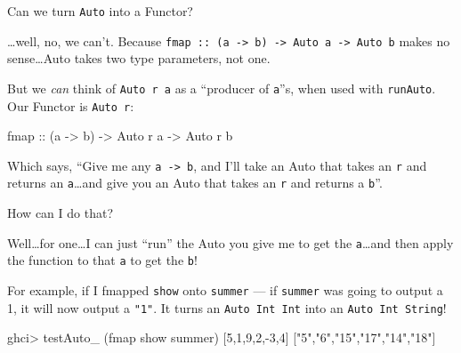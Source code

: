 \documentclass[]{article}
\newenvironment{Shaded}{}{}
\newcommand{\CommentTok}[1]{\textcolor[rgb]{0.38,0.63,0.69}{\textit{#1}}}
\newcommand{\DataTypeTok}[1]{\textcolor[rgb]{0.56,0.13,0.00}{#1}}
\newcommand{\DecValTok}[1]{\textcolor[rgb]{0.25,0.63,0.44}{#1}}
\newcommand{\FunctionTok}[1]{\textcolor[rgb]{0.02,0.16,0.49}{#1}}
\newcommand{\KeywordTok}[1]{\textcolor[rgb]{0.00,0.44,0.13}{\textbf{#1}}}
\newcommand{\NormalTok}[1]{#1}
\newcommand{\OtherTok}[1]{\textcolor[rgb]{0.00,0.44,0.13}{#1}}
\newcommand{\StringTok}[1]{\textcolor[rgb]{0.25,0.44,0.63}{#1}}
\begin{document}
Can we turn \texttt{Auto} into a Functor?

\ldots{}well, no, we can't. Because
\texttt{fmap\ ::\ (a\ -\textgreater{}\ b)\ -\textgreater{}\ Auto\ a\ -\textgreater{}\ Auto\ b}
makes no sense\ldots{}Auto takes two type parameters, not one.

But we \emph{can} think of \texttt{Auto\ r\ a} as a ``producer of \texttt{a}''s,
when used with \texttt{runAuto}. Our Functor is \texttt{Auto\ r}:

\begin{Shaded}
\begin{Highlighting}[]
\NormalTok{fmap}\OtherTok{ ::}\NormalTok{ (a }\OtherTok{->}\NormalTok{ b) }\OtherTok{->} \DataTypeTok{Auto}\NormalTok{ r a }\OtherTok{->} \DataTypeTok{Auto}\NormalTok{ r b}
\end{Highlighting}
\end{Shaded}

Which says, ``Give me any \texttt{a\ -\textgreater{}\ b}, and I'll take an Auto
that takes an \texttt{r} and returns an \texttt{a}\ldots{}and give you an Auto
that takes an \texttt{r} and returns a \texttt{b}''.

How can I do that?

Well\ldots{}for one\ldots{}I can just ``run'' the Auto you give me to get the
\texttt{a}\ldots{}and then apply the function to that \texttt{a} to get the
\texttt{b}!

For example, if I fmapped \texttt{show} onto \texttt{summer} --- if
\texttt{summer} was going to output a 1, it will now output a \texttt{"1"}. It
turns an \texttt{Auto\ Int\ Int} into an \texttt{Auto\ Int\ String}!

\begin{Shaded}
\end{Shaded}

\begin{Shaded}
\begin{Highlighting}[]
\NormalTok{ghci}\FunctionTok{>}\NormalTok{ testAuto_ (fmap show summer) [}\DecValTok{5}\NormalTok{,}\DecValTok{1}\NormalTok{,}\DecValTok{9}\NormalTok{,}\DecValTok{2}\NormalTok{,}\FunctionTok{-}\DecValTok{3}\NormalTok{,}\DecValTok{4}\NormalTok{]}
\NormalTok{[}\StringTok{"5"}\NormalTok{,}\StringTok{"6"}\NormalTok{,}\StringTok{"15"}\NormalTok{,}\StringTok{"17"}\NormalTok{,}\StringTok{"14"}\NormalTok{,}\StringTok{"18"}\NormalTok{]}
\end{Highlighting}
\end{Shaded}
\end{document}
